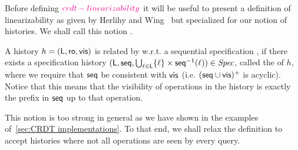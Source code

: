 Before defining ${\color{magenta} crdt-linearizability}{}$ it will be useful to present a definition
of linearizability as given by Herlihy and Wing~\cite{HerlihyW90} but
specialized for our notion of histories.
We shall call this notion \HWLin{}.

\begin{definition}[\HWLin{}]
  A history $h = (\mathsf{L},\mathsf{ro},\mathsf{vis})$ is related by \HWLin{}
  w.r.t.
  a sequential specification \Spec{}, if there exists a specification
  history $(\mathsf{L}, \mathsf{seq}, \bigcup_{\ell \in
    \mathsf{L}} \{\ell\} \times \mathsf{seq}^{-1}(\ell)) \in \mathit{Spec}{}$,
  called the \hwlinearization{} of $h$, where we require that $\mathsf{seq}$ be
  consistent with $\mathsf{vis}$ (i.e.
  $(\mathsf{seq} \cup \mathsf{vis})^+$ is acyclic).
  Notice that this means that the visibility of operations in the
  \hwlinear{} history is exactly the prefix in $\mathsf{seq}$ up to that
  operation.
\end{definition}

This notion is too strong in general as we have shown in the examples
of~\ref{sec:CRDT implementations}.
To that end, we shall relax the definition to accept histories where
not all operations are seen by every query.

